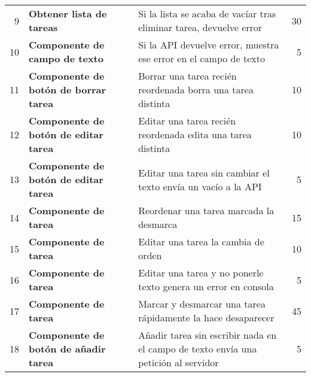 \begin{table}[]
\begin{adjustbox}{width=\columnwidth,center}
\begin{tabular}{rllr}
9                               & \textbf{Obtener lista de tareas}                & Si la lista se acaba de vacíar tras eliminar tarea, devuelve error                 & 30                                                      \\
10                              & \textbf{Componente de campo de texto}           & Si la API devuelve error, muestra ese error en el campo de texto                   & 5                                                       \\
11                              & \textbf{Componente de botón de borrar tarea}    & Borrar una tarea recién reordenada borra una tarea distinta                        & 10                                                      \\
12                              & \textbf{Componente de botón de editar tarea}    & Editar una tarea recién reordenada edita una tarea distinta                        & 10                                                      \\
13                              & \textbf{Componente de botón de editar tarea}    & Editar una tarea sin cambiar el texto envía un vacío a la API                      & 5                                                       \\
14                              & \textbf{Componente de tarea}                    & Reordenar una tarea marcada la desmarca                                            & 15                                                      \\
15                              & \textbf{Componente de tarea}                    & Editar una tarea la cambia de orden                                                & 10                                                      \\
16                              & \textbf{Componente de tarea}                    & Editar una tarea y no ponerle texto genera un error en consola                     & 5                                                       \\
17                              & \textbf{Componente de tarea}                    & Marcar y desmarcar una tarea rápidamente la hace desaparecer                       & 45                                                      \\
18                              & \textbf{Componente de botón de añadir tarea}    & Añadir tarea sin escribir nada en el campo de texto envía una petición al servidor & 5                                                       \\

\end{tabular}
\end{adjustbox}
\end{table}
